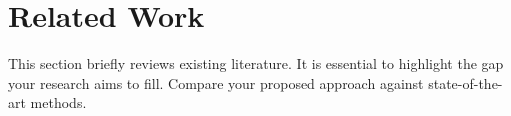 \section{Related Work}
\label{sec:related}

This section briefly reviews existing literature. It is essential to highlight the gap your research aims to fill. Compare your proposed approach against state-of-the-art methods.
